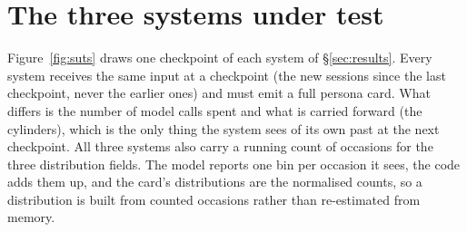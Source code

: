 \documentclass{article}
\begin{document}
\section{The three systems under test}
\label{app:suts}

Figure~\ref{fig:suts} draws one checkpoint of each system of \S\ref{sec:results}. Every system
receives the same input at a checkpoint (the new sessions since the last checkpoint, never the
earlier ones) and must emit a full persona card. What differs is the number of model calls
spent and what is carried forward (the cylinders), which is the only thing the system sees of its own
past at the next checkpoint. All three systems also carry a running count of occasions for the three
distribution fields. The model reports one bin per occasion it sees, the code adds them up, and the
card's distributions are the normalised counts, so a distribution is built from counted occasions
rather than re-estimated from memory.
\end{document}
